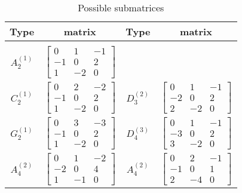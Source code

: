 \documentclass{amsart}
\theoremstyle{definition}
\theoremstyle{remark}
\numberwithin{equation}{section}
\newcommand{\0}{{\mathbf{0}}}
\begin{document}
	\begin{table}
	\caption{Possible submatrices}
	\label{submat tab}	
	\begin{center}
	\begin{tabular}{|cc|cc|}
	Type & matrix & Type & matrix \\
	\hline & & & \\[-1ex]
	$A_{2}^{(1)}$ & $\left[\begin{array}{rrr}
	0 & 1 & -1 \\
	-1 & 0 & 2 \\
	1 & -2 & 0
	\end{array}\right]$ & & \\[4ex]
	$C_{2}^{(1)}$ & $\left[\begin{array}{rrr}
	0 & 2 & -2 \\
	-1 & 0 & 2 \\
	1 & -2 & 0
	\end{array}\right]$ &
	$D_{3}^{(2)}$ & $\left[\begin{array}{rrr}
	0 & 1 & -1 \\
	-2 & 0 & 2 \\
	2 & -2 & 0
	\end{array}\right]$ \\[4ex]
	$G_2^{(1)}$ & $\left[\begin{array}{rrr}
	0 & 3 & -3 \\
	-1 & 0 & 2 \\
	1 & -2 & 0
	\end{array}\right]$ &
	$D_4^{(3)}$ & $\left[\begin{array}{rrr}
	0 & 1 & -1 \\
	-3 & 0 & 2 \\
	3 & -2 & 0
	\end{array}\right]$ \\[4ex]
	$A_{4}^{(2)}$ & $\left[\begin{array}{rrr}
	0 & 1 & -2 \\
	-2 & 0 & 4 \\
	1 & -1 & 0
	\end{array}\right]$ &
	$A_{4}^{(2)}$ & $\left[\begin{array}{rrr}
	0 & 2 & -1 \\
	-1 & 0 & 1 \\
	2 & -4 & 0
	\end{array}\right]$ 
	\end{tabular}
	\end{center}	
	\end{table}
\end{document}
